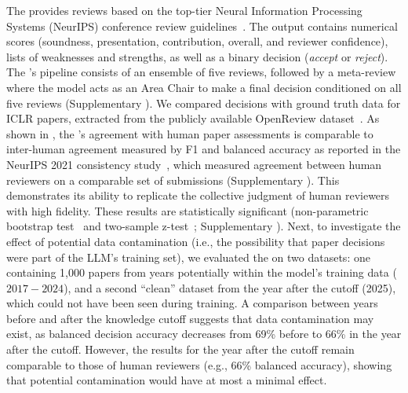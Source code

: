The \ourreviewer provides reviews based on the top-tier Neural Information Processing Systems (NeurIPS) conference review guidelines~\citep{neurips2022reviewerguidelines}.
The output contains numerical scores (soundness, presentation, contribution, overall, and reviewer confidence), lists of weaknesses and strengths, as well as a binary decision (\textit{accept} or \textit{reject}).
The \ourreviewer's pipeline consists of an ensemble of five reviews, followed by a meta-review where the model acts as an Area Chair to make a final decision conditioned on all five reviews (Supplementary ).
We compared \ourreviewer decisions with ground truth data for ICLR papers, extracted from the publicly available OpenReview dataset~\citep{gonzalez2024learning}.
As shown in , the \ourreviewer's agreement with human paper assessments is comparable to inter-human agreement measured by F1 and balanced accuracy as reported in the NeurIPS 2021 consistency study~\citep{beygelzimer2021neurips}, which measured agreement between human reviewers on a comparable set of submissions (Supplementary ).
This demonstrates its ability to replicate the collective judgment of human reviewers with high fidelity.
These results are statistically significant (non-parametric bootstrap test~\citep{efron1993bootstrap} and two-sample z-test~\citep{lehmann1959ztest}; Supplementary ).
Next, to investigate the effect of potential data contamination (i.e., the possibility that paper decisions were part of the LLM's training set), we evaluated the \ourreviewer on two datasets: one containing 1,000 papers from years potentially within the model's training data ($2017 - 2024$), and a second ``clean'' dataset from the year after the cutoff (2025), which could not have been seen during training.
A comparison between years before and after the knowledge cutoff suggests that data contamination may exist, as balanced decision accuracy decreases from 69\% before to 66\% in the year after the cutoff.
However, the results for the year after the cutoff remain comparable to those of human reviewers (e.g., 66\% balanced accuracy), showing that potential contamination would have at most a minimal effect.

